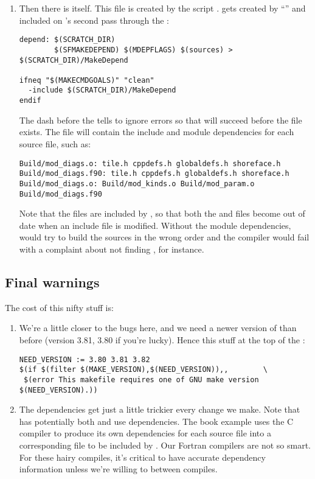 \begin{enumerate}
\item Then there is  itself. This file is created
by the  script . 
gets created by ``'' and included on 's
second pass through the :
\begin{verbatim}
depend: $(SCRATCH_DIR)
        $(SFMAKEDEPEND) $(MDEPFLAGS) $(sources) > $(SCRATCH_DIR)/MakeDepend 

ifneq "$(MAKECMDGOALS)" "clean"
  -include $(SCRATCH_DIR)/MakeDepend
endif
\end{verbatim}
The dash before the  tells  to ignore
errors so that  will succeed before the file
exists. The  file will contain the include and
module dependencies for each source file, such as:
\begin{verbatim}
Build/mod_diags.o: tile.h cppdefs.h globaldefs.h shoreface.h
Build/mod_diags.f90: tile.h cppdefs.h globaldefs.h shoreface.h
Build/mod_diags.o: Build/mod_kinds.o Build/mod_param.o Build/mod_diags.f90
\end{verbatim}
Note that the  files are included by , so that
both the  and  files become out of date when an
include file is modified. Without the module dependencies,
 would try to build the sources in the wrong order and
the compiler would fail with a complaint about not finding
, for instance.
\end{enumerate}

\subsection{Final warnings}

The cost of this nifty  stuff is:
\begin{enumerate}
\item We're a little closer to the  bugs here, and we
need a newer version of  than before (version 3.81,
3.80 if you're lucky).
Hence this stuff at the top of the :
\begin{verbatim}
NEED_VERSION := 3.80 3.81 3.82
$(if $(filter $(MAKE_VERSION),$(NEED_VERSION)),,        \
 $(error This makefile requires one of GNU make version $(NEED_VERSION).))
\end{verbatim}

\item The  dependencies get just a little trickier every
change we make. Note that \code{F90} has potentially both \code{include}
and \code{module} use dependencies. The book example uses the C compiler
to produce its own dependencies for each source file into a corresponding
\code{.d} file to be included by \code{make}. Our Fortran compilers are
not so smart. For these hairy compiles, it's critical to have accurate
dependency information unless we're willing to \code{make clean} between
compiles.
\end{enumerate}
